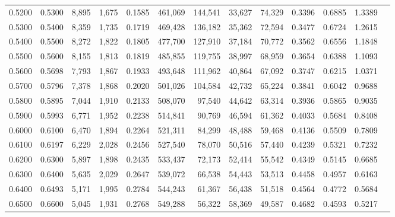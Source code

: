 \begin{tabular}{rrrrrrrrrrrrr}
0.5200 & 0.5300 &  8,895 & 1,675 &                                     0.1585 & 461,069 & 144,541 &  33,627 &  74,329 & 0.3396 & 0.6885 & 1.3389 \\
0.5300 & 0.5400 &  8,359 & 1,735 &                                     0.1719 & 469,428 & 136,182 &  35,362 &  72,594 & 0.3477 & 0.6724 & 1.2615 \\
0.5400 & 0.5500 &  8,272 & 1,822 &                                     0.1805 & 477,700 & 127,910 &  37,184 &  70,772 & 0.3562 & 0.6556 & 1.1848 \\
0.5500 & 0.5600 &  8,155 & 1,813 &                                     0.1819 & 485,855 & 119,755 &  38,997 &  68,959 & 0.3654 & 0.6388 & 1.1093 \\
0.5600 & 0.5698 &  7,793 & 1,867 &                                     0.1933 & 493,648 & 111,962 &  40,864 &  67,092 & 0.3747 & 0.6215 & 1.0371 \\
0.5700 & 0.5796 &  7,378 & 1,868 &                                     0.2020 & 501,026 & 104,584 &  42,732 &  65,224 & 0.3841 & 0.6042 & 0.9688 \\
0.5800 & 0.5895 &  7,044 & 1,910 &                                     0.2133 & 508,070 &  97,540 &  44,642 &  63,314 & 0.3936 & 0.5865 & 0.9035 \\
0.5900 & 0.5993 &  6,771 & 1,952 &                                     0.2238 & 514,841 &  90,769 &  46,594 &  61,362 & 0.4033 & 0.5684 & 0.8408 \\
0.6000 & 0.6100 &  6,470 & 1,894 &                                     0.2264 & 521,311 &  84,299 &  48,488 &  59,468 & 0.4136 & 0.5509 & 0.7809 \\
0.6100 & 0.6197 &  6,229 & 2,028 &                                     0.2456 & 527,540 &  78,070 &  50,516 &  57,440 & 0.4239 & 0.5321 & 0.7232 \\
0.6200 & 0.6300 &  5,897 & 1,898 &                                     0.2435 & 533,437 &  72,173 &  52,414 &  55,542 & 0.4349 & 0.5145 & 0.6685 \\
0.6300 & 0.6400 &  5,635 & 2,029 &                                     0.2647 & 539,072 &  66,538 &  54,443 &  53,513 & 0.4458 & 0.4957 & 0.6163 \\
0.6400 & 0.6493 &  5,171 & 1,995 &                                     0.2784 & 544,243 &  61,367 &  56,438 &  51,518 & 0.4564 & 0.4772 & 0.5684 \\
0.6500 & 0.6600 &  5,045 & 1,931 &                                     0.2768 & 549,288 &  56,322 &  58,369 &  49,587 & 0.4682 & 0.4593 & 0.5217 \\

\end{tabular}
